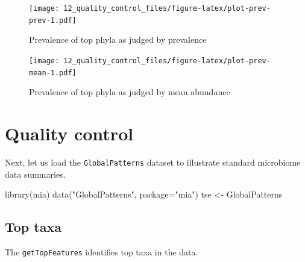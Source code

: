 \documentclass[
]{book}
\newenvironment{Shaded}{\begin{snugshade}}{\end{snugshade}}
\newcommand{\AttributeTok}[1]{\textcolor[rgb]{0.77,0.63,0.00}{#1}}
\newcommand{\FunctionTok}[1]{\textcolor[rgb]{0.00,0.00,0.00}{#1}}
\newcommand{\NormalTok}[1]{#1}
\newcommand{\OtherTok}[1]{\textcolor[rgb]{0.56,0.35,0.01}{#1}}
\newcommand{\SpecialCharTok}[1]{\textcolor[rgb]{0.00,0.00,0.00}{#1}}
\newcommand{\StringTok}[1]{\textcolor[rgb]{0.31,0.60,0.02}{#1}}
\begin{document}
\begin{figure}
\centering
\texttt{[image: 12\_quality\_control\_files/figure-latex/plot-prev-prev-1.pdf]}
\caption{\label{fig:plot-prev-prev}Prevalence of top phyla as judged by prevalence}
\end{figure}

\begin{Shaded}
\end{Shaded}

\begin{figure}
\centering
\texttt{[image: 12\_quality\_control\_files/figure-latex/plot-prev-mean-1.pdf]}
\caption{\label{fig:plot-prev-mean}Prevalence of top phyla as judged by mean abundance}
\end{figure}

\hypertarget{qc}{%
\section{Quality control}\label{qc}}

Next, let us load the \texttt{GlobalPatterns} dataset to illustrate standard
microbiome data summaries.

\begin{Shaded}
\begin{Highlighting}[]
\FunctionTok{library}\NormalTok{(mia)}
\FunctionTok{data}\NormalTok{(}\StringTok{"GlobalPatterns"}\NormalTok{, }\AttributeTok{package=}\StringTok{"mia"}\NormalTok{)}
\NormalTok{tse }\OtherTok{\textless{}{-}}\NormalTok{ GlobalPatterns }
\end{Highlighting}
\end{Shaded}

\hypertarget{top-taxa}{%
\subsection{Top taxa}\label{top-taxa}}

The \texttt{getTopFeatures} identifies top taxa in the data.
\end{document}
